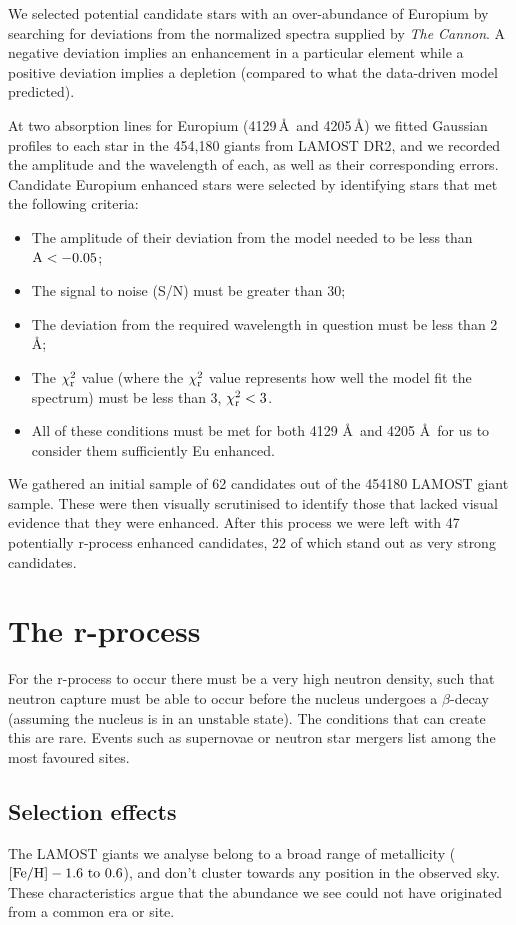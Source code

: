 \documentclass[a4paper,fleqn,usenatbib]{mnras}
\begin{document}
	We selected potential candidate stars with an over-abundance of Europium by searching for deviations from the normalized spectra supplied by \textit{The Cannon}. A negative deviation implies an enhancement in a particular element while a positive deviation implies a depletion (compared to what the data-driven model predicted). 
	
	At two absorption lines for Europium (4129\,\AA\ and 4205\,\AA) we fitted Gaussian profiles to each star in the 454,180 giants from LAMOST DR2, and we recorded the amplitude and the wavelength of each, as well as their corresponding errors. Candidate Europium enhanced stars were selected by identifying stars that met the following criteria:
	
	\begin{itemize}
		\item The amplitude of their deviation from the model needed to be less than $\rm{A}<-0.05$;
		\item The signal to noise (S/N) must be greater than 30;
		\item The deviation from the required wavelength in question must be less than 2 \AA;
		\item The $\chi_{\rm{r}}^{2}$ value (where the $\chi_{\rm{r}}^{2}$ value represents how well the model fit the spectrum) must be less than 3, $\chi_{\rm{r}}^{2}<3$.
		\item All of these conditions must be met for both 4129 \AA\ and 4205 \AA\ for us to consider them sufficiently Eu enhanced.
	\end{itemize}   
	
	We gathered an initial sample of 62 candidates out of the 454180 LAMOST giant sample. These were then visually scrutinised to identify those that lacked visual evidence that they were enhanced. After this process we were left with 47 potentially r-process enhanced candidates, 22 of which stand out as very strong candidates.
	
	\section{The r-process}
	For the r-process to occur there must be a very high neutron density, such that neutron capture must be able to occur before the nucleus undergoes a $\beta$-decay (assuming the nucleus is in an unstable state). The conditions that can create this are rare. Events such as supernovae or neutron star mergers list among the most favoured sites.
	
	\subsection{Selection effects}
	The LAMOST giants we analyse belong to a broad range of metallicity ($\rm{[Fe/H]} -1.6\ \rm{to}\ 0.6$), and don't cluster towards any position in the observed sky. These characteristics argue that the abundance we see could not have originated from a common era or site. 
	
\end{document}
